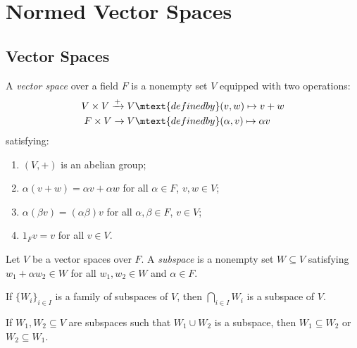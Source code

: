 \chapter{Normed Vector Spaces}

\section{Vector Spaces}
    \begin{definition}
        A \textit{vector space} over a field $F$ is a nonempty set $V$ equipped with two operations:
            \begin{equation*}
            \begin{split}
                V \times V \xrightarrow{+}V &\mtext{defined by} (v,w)\mapsto v+w \\
                F \times V \rightarrow V &\mtext{defined by} (\alpha,v)\mapsto \alpha v
            \end{split}
            \end{equation*}
        satisfying:
            \begin{enumerate}[label = (\arabic*)]
                \item $(V,+)$ is an abelian group;
                \item $\alpha(v+w) = \alpha v + \alpha w$ for all $\alpha \in F$, $v,w \in V$;
                \item $\alpha(\beta v) = (\alpha \beta)v$ for all $\alpha,\beta \in F$, $v \in V$;
                \item $1_F v = v$ for all $v \in V$.
            \end{enumerate}
    \end{definition}

    \begin{definition}
        Let $V$ be a vector spaces over $F$. A \textit{subspace} is a nonempty set $W \subseteq V$ satisfying $w_1 + \alpha w_2 \in W$ for all $w_1,w_2 \in W$ and $\alpha \in F$.
    \end{definition}

    \begin{exercise}\label{ex:intersection}
        If $\{W_i\}_{i \in I}$ is a family of subspaces of $V$, then $\bigcap_{i \in I}W_i$ is a subspace of $V$.
    \end{exercise}

    \begin{exercise}\label{ex:union}
        If $W_1,W_2 \subseteq V$ are subspaces such that $W_1 \cup W_2$ is a subspace, then $W_1 \subseteq W_2$ or $W_2 \subseteq W_1$.
    \end{exercise}

